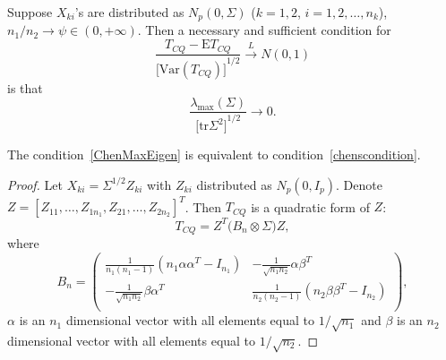 \begin{theorem}
    Suppose $X_{ki}$'s are distributed as $N_p(0,\Sigma)$ ($k=1,2$, $i=1,2,\ldots,n_k$), $n_1/n_2\to\psi\in (0,+\infty)$. Then a necessary and sufficient condition for 
    \begin{equation}
        \frac{T_{CQ}-\mathrm{E}T_{CQ}}{{\big[\mathrm{Var}(T_{CQ})\big]}^{1/2}}\xrightarrow{L}N(0,1)
    \end{equation}
    is that
    \begin{equation}\label{ChenMaxEigen}
        \frac{\lambda_{\max}(\Sigma)}{{\big[\mathrm{tr}\Sigma^2\big]}^{1/2}}\to 0.
    \end{equation}

\begin{remark}
    The condition~\ref{ChenMaxEigen} is equivalent to condition~\ref{chenscondition}.
\end{remark}


    \begin{proof}
        Let $X_{ki}=\Sigma^{1/2}Z_{ki}$ with $Z_{ki}$ distributed as $N_p(0,I_{p})$. Denote $Z={[Z_{11},\ldots,Z_{1n_1},Z_{21},\ldots,Z_{2n_2}]}^T$. Then $T_{CQ}$ is a quadratic form of $Z$:
        \begin{equation}
            T_{CQ}=Z^T \big( B_n\otimes \Sigma \big) Z,
        \end{equation}
        where 
        \begin{equation}
            B_n=\begin{pmatrix}
                \frac{1}{n_1(n_1-1)}(n_1\alpha\alpha^T-I_{n_1})&
                -\frac{1}{\sqrt{n_1 n_2}}\alpha \beta^T\\
                -\frac{1}{\sqrt{n_1 n_2}}\beta \alpha^T&
                \frac{1}{n_2(n_2-1)}(n_2\beta\beta^T-I_{n_2})\\
            \end{pmatrix},
        \end{equation}
        $\alpha$ is an $n_1$ dimensional vector with all elements equal to $1/\sqrt{n_1}$ and $\beta$ is an $n_2$ dimensional vector with all elements equal to $1/\sqrt{n_2}$.


\end{proof}
\end{theorem}
